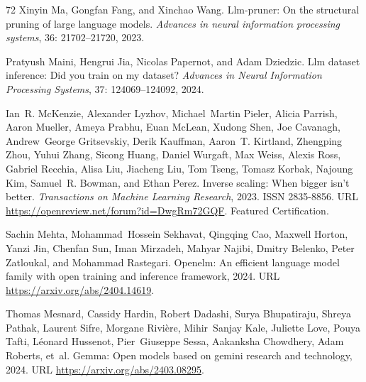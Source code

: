 \begin{thebibliography}{72}
Xinyin Ma, Gongfan Fang, and Xinchao Wang.
\newblock Llm-pruner: On the structural pruning of large language models.
\newblock \emph{Advances in neural information processing systems}, 36: 21702--21720, 2023.

Pratyush Maini, Hengrui Jia, Nicolas Papernot, and Adam Dziedzic.
\newblock Llm dataset inference: Did you train on my dataset?
\newblock \emph{Advances in Neural Information Processing Systems}, 37: 124069--124092, 2024.

Ian~R. McKenzie, Alexander Lyzhov, Michael~Martin Pieler, Alicia Parrish, Aaron Mueller, Ameya Prabhu, Euan McLean, Xudong Shen, Joe Cavanagh, Andrew~George Gritsevskiy, Derik Kauffman, Aaron~T. Kirtland, Zhengping Zhou, Yuhui Zhang, Sicong Huang, Daniel Wurgaft, Max Weiss, Alexis Ross, Gabriel Recchia, Alisa Liu, Jiacheng Liu, Tom Tseng, Tomasz Korbak, Najoung Kim, Samuel~R. Bowman, and Ethan Perez.
\newblock Inverse scaling: When bigger isn't better.
\newblock \emph{Transactions on Machine Learning Research}, 2023.
\newblock ISSN 2835-8856.
\newblock URL \url{https://openreview.net/forum?id=DwgRm72GQF}.
\newblock Featured Certification.

Sachin Mehta, Mohammad~Hossein Sekhavat, Qingqing Cao, Maxwell Horton, Yanzi Jin, Chenfan Sun, Iman Mirzadeh, Mahyar Najibi, Dmitry Belenko, Peter Zatloukal, and Mohammad Rastegari.
\newblock Openelm: An efficient language model family with open training and inference framework, 2024.
\newblock URL \url{https://arxiv.org/abs/2404.14619}.

Thomas Mesnard, Cassidy Hardin, Robert Dadashi, Surya Bhupatiraju, Shreya Pathak, Laurent Sifre, Morgane Rivière, Mihir~Sanjay Kale, Juliette Love, Pouya Tafti, Léonard Hussenot, Pier~Giuseppe Sessa, Aakanksha Chowdhery, Adam Roberts, et~al.
\newblock Gemma: Open models based on gemini research and technology, 2024.
\newblock URL \url{https://arxiv.org/abs/2403.08295}.


\end{thebibliography}
